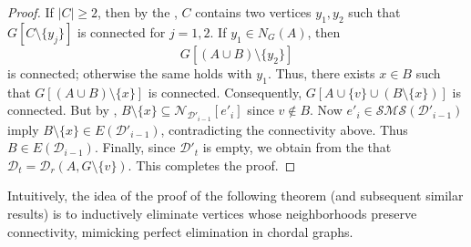 \documentclass[12pt,reqno]{amsart}
\theoremstyle{definition}
\def\N{\mathcal{N}}
\def\D{\mathcal{D}}
\def\SMS{\mathcal{SMS}}
\begin{document}
\begin{proof}
If $|C|\ge 2$, then by the , $C$ contains two vertices $y_1,y_2$ such that $G[C\setminus\{y_j\}]$ is connected for $j=1,2$.  
If $y_1\in N_G(A)$, then 
\[
G[(A\cup B)\setminus\{y_2\}]
\]
is connected; otherwise the same holds with $y_1$.  
Thus, there exists $x \in B$ such that $G[(A\cup B)\setminus\{x\}]$
is connected.
Consequently, $G[A\cup\{v\}\cup(B\setminus\{x\})]$ is connected.  
But by , $B\setminus\{x\}\subseteq \N_{\D'_{i-1}}[e'_{i}]$ since $v \notin B$. Now $e'_{i}\in \SMS(\D'_{i-1})$ imply $B\setminus\{x\}\in E(\D'_{i-1})$,
contradicting the connectivity above.  
Thus $B\in E(\D_{i-1})$. Finally, since $\D'_t$ is empty, we obtain from the  that $\D_t=\D_r(A,G\setminus\{v\})$. 
 This completes the proof.
\end{proof}

Intuitively, the idea of the proof of the following theorem (and subsequent similar results) is to inductively eliminate vertices whose neighborhoods preserve connectivity, mimicking perfect elimination in chordal graphs.
\end{document}
